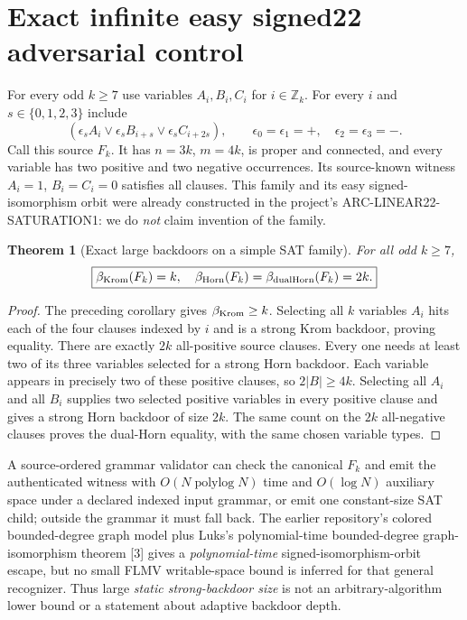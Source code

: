 \documentclass[11pt]{article}
\newtheorem{theorem}{Theorem}
\begin{document}
\section{Exact infinite easy signed22 adversarial control}
For every odd $k\ge7$ use variables $A_i,B_i,C_i$ for $i\in\mathbb Z_k$. For every $i$ and $s\in\{0,1,2,3\}$ include
\[
 (\epsilon_s A_i\lor\epsilon_s B_{i+s}\lor\epsilon_s C_{i+2s}),\qquad
 \epsilon_0=\epsilon_1=+,\quad \epsilon_2=\epsilon_3=-.
\]
Call this source $F_k$. It has $n=3k$, $m=4k$, is proper and connected, and every variable has two positive and two negative occurrences. Its source-known witness $A_i=1$, $B_i=C_i=0$ satisfies all clauses. This family and its easy signed-isomorphism orbit were already constructed in the project's ARC-LINEAR22-SATURATION1: we do \emph{not} claim invention of the family.

\begin{theorem}[Exact large backdoors on a simple SAT family]
For all odd $k\ge7$,
\[
 \boxed{\beta_{\rm Krom}(F_k)=k,\quad
 \beta_{\rm Horn}(F_k)=\beta_{\rm dualHorn}(F_k)=2k.}
\]
\end{theorem}
\begin{proof}
The preceding corollary gives $\beta_{\rm Krom}\ge k$. Selecting all $k$ variables $A_i$ hits each of the four clauses indexed by $i$ and is a strong Krom backdoor, proving equality. There are exactly $2k$ all-positive source clauses. Every one needs at least two of its three variables selected for a strong Horn backdoor. Each variable appears in precisely two of these positive clauses, so $2|B|\ge4k$. Selecting all $A_i$ and all $B_i$ supplies two selected positive variables in every positive clause and gives a strong Horn backdoor of size $2k$. The same count on the $2k$ all-negative clauses proves the dual-Horn equality, with the same chosen variable types.
\end{proof}

A source-ordered grammar validator can check the canonical $F_k$ and emit the authenticated witness with $O(N\operatorname{polylog}N)$ time and $O(\log N)$ auxiliary space under a declared indexed input grammar, or emit one constant-size SAT child; outside the grammar it must fall back. The earlier repository's colored bounded-degree graph model plus Luks's polynomial-time bounded-degree graph-isomorphism theorem [3] gives a \emph{polynomial-time} signed-isomorphism-orbit escape, but no small FLMV writable-space bound is inferred for that general recognizer. Thus large \emph{static strong-backdoor size} is not an arbitrary-algorithm lower bound or a statement about adaptive backdoor depth.
\end{document}
